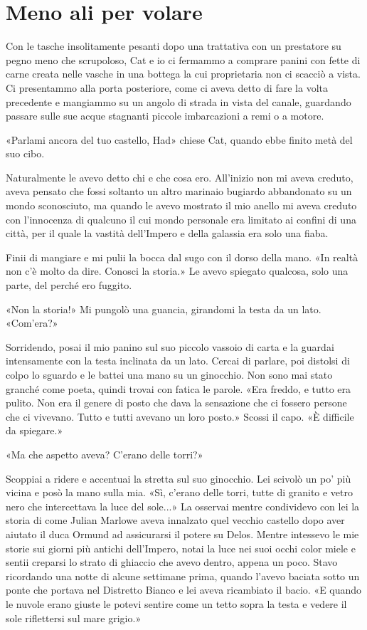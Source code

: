 \chapter{Meno ali per volare}

Con le tasche insolitamente pesanti dopo una trattativa con un
prestatore su pegno meno che scrupoloso, Cat e io ci fermammo a comprare
panini con fette di carne creata nelle vasche in una bottega la cui
proprietaria non ci scacciò a vista. Ci presentammo alla porta
posteriore, come ci aveva detto di fare la volta precedente e mangiammo
su un angolo di strada in vista del canale, guardando passare sulle sue
acque stagnanti piccole imbarcazioni a remi o a motore.

«Parlami ancora del tuo castello, Had» chiese Cat, quando ebbe finito
metà del suo cibo.

Naturalmente le avevo detto chi e che cosa ero. All'inizio non mi aveva
creduto, aveva pensato che fossi soltanto un altro marinaio bugiardo
abbandonato su un mondo sconosciuto, ma quando le avevo mostrato il mio
anello mi aveva creduto con l'innocenza di qualcuno il cui mondo
personale era limitato ai confini di una città, per il quale la vastità
dell'Impero e della galassia era solo una fiaba.

Finii di mangiare e mi pulii la bocca dal sugo con il dorso della mano.
«In realtà non c'è molto da dire. Conosci la storia.» Le avevo spiegato
qualcosa, solo una parte, del perché ero fuggito.

«Non la storia!» Mi pungolò una guancia, girandomi la testa da un lato.
«Com'era?»

Sorridendo, posai il mio panino sul suo piccolo vassoio di carta e la
guardai intensamente con la testa inclinata da un lato. Cercai di
parlare, poi distolsi di colpo lo sguardo e le battei una mano su un
ginocchio. Non sono mai stato granché come poeta, quindi trovai con
fatica le parole. «Era freddo, e tutto era pulito. Non era il genere di
posto che dava la sensazione che ci fossero persone che ci vivevano.
Tutto e tutti avevano un loro posto.» Scossi il capo. «È difficile da
spiegare.»

«Ma che aspetto aveva? C'erano delle torri?»

Scoppiai a ridere e accentuai la stretta sul suo ginocchio. Lei scivolò
un po' più vicina e posò la mano sulla mia. «Sì, c'erano delle torri,
tutte di granito e vetro nero che intercettava la luce del sole...» La
osservai mentre condividevo con lei la storia di come Julian Marlowe
aveva innalzato quel vecchio castello dopo aver aiutato il duca Ormund
ad assicurarsi il potere su Delos. Mentre intessevo le mie storie sui
giorni più antichi dell'Impero, notai la luce nei suoi occhi color miele
e sentii creparsi lo strato di ghiaccio che avevo dentro, appena un
poco. Stavo ricordando una notte di alcune settimane prima, quando
l'avevo baciata sotto un ponte che portava nel Distretto Bianco e lei
aveva ricambiato il bacio. «E quando le nuvole erano giuste le potevi
sentire come un tetto sopra la testa e vedere il sole riflettersi sul
mare grigio.»

